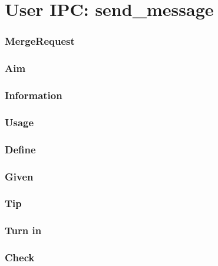 \documentclass[]{book}
\begin{document}
\section{User IPC: send\_message}\label{user-ipc-sendux5fmessage}

\subsubsection*{MergeRequest}\label{mergerequest-16}

\subsubsection*{Aim}\label{aim-16}

\subsubsection*{Information}\label{information-15}

\subsubsection*{Usage}\label{usage-15}

\subsubsection*{Define}\label{define-15}

\subsubsection*{Given}\label{given-15}

\subsubsection*{Tip}\label{tip-15}

\subsubsection*{Turn in}\label{turn-in-15}

\subsubsection*{Check}\label{check-15}
\end{document}
